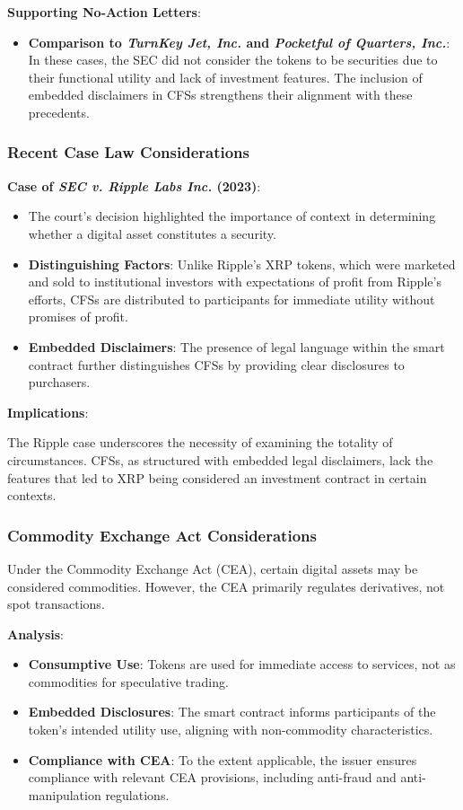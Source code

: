 \documentclass[a4paper,12pt]{article}
\begin{document}
\textbf{Supporting No-Action Letters}:

\begin{itemize}
\item \textbf{Comparison to \emph{TurnKey Jet, Inc.} and \emph{Pocketful of Quarters, Inc.}}: In these cases, the SEC did not consider the tokens to be securities due to their functional utility and lack of investment features. The inclusion of embedded disclaimers in CFSs strengthens their alignment with these precedents.
\end{itemize}

\subsubsection{Recent Case Law Considerations}
\textbf{Case of \emph{SEC v. Ripple Labs Inc.} (2023)}:

\begin{itemize}
\item The court's decision highlighted the importance of context in determining whether a digital asset constitutes a security.
\item \textbf{Distinguishing Factors}: Unlike Ripple's XRP tokens, which were marketed and sold to institutional investors with expectations of profit from Ripple's efforts, CFSs are distributed to participants for immediate utility without promises of profit.
\item \textbf{Embedded Disclaimers}: The presence of legal language within the smart contract further distinguishes CFSs by providing clear disclosures to purchasers.
\end{itemize}

\textbf{Implications}:

The Ripple case underscores the necessity of examining the totality of circumstances. CFSs, as structured with embedded legal disclaimers, lack the features that led to XRP being considered an investment contract in certain contexts.

\subsubsection{Commodity Exchange Act Considerations}
Under the Commodity Exchange Act (CEA), certain digital assets may be considered commodities. However, the CEA primarily regulates derivatives, not spot transactions.

\textbf{Analysis}:

\begin{itemize}
\item \textbf{Consumptive Use}: Tokens are used for immediate access to services, not as commodities for speculative trading.
\item \textbf{Embedded Disclosures}: The smart contract informs participants of the token's intended utility use, aligning with non-commodity characteristics.
\item \textbf{Compliance with CEA}: To the extent applicable, the issuer ensures compliance with relevant CEA provisions, including anti-fraud and anti-manipulation regulations.
\end{itemize}
\end{document}
